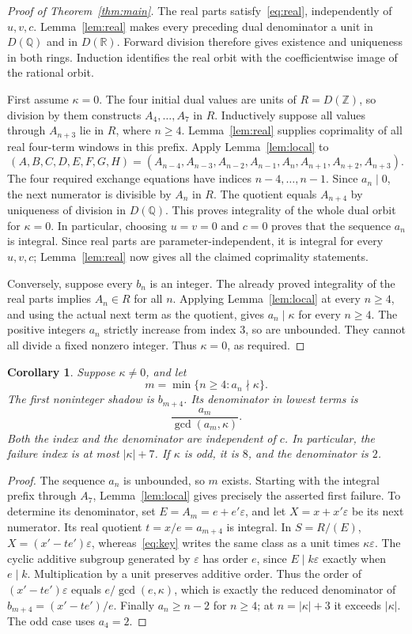 \documentclass[11pt]{article}
\newtheorem{corollary}[theorem]{Corollary}
\newcommand{\ZZ}{\mathbb Z}
\newcommand{\QQ}{\mathbb Q}
\newcommand{\RR}{\mathbb R}
\newcommand{\eps}{\varepsilon}
\begin{document}
\begin{proof}[Proof of Theorem~\ref{thm:main}]
The real parts satisfy~\eqref{eq:real}, independently of $u,v,c$.
Lemma~\ref{lem:real} makes every preceding dual denominator a unit in
$D(\QQ)$ and in $D(\RR)$. Forward division therefore gives existence
and uniqueness in both rings. Induction identifies the real orbit
with the coefficientwise image of the rational orbit.

First assume $\kappa=0$. The four initial dual values are units of
$R=D(\ZZ)$, so division by them constructs $A_4,\ldots,A_7$ in $R$.
Inductively suppose all values through $A_{n+3}$ lie in $R$, where
$n\ge4$. Lemma~\ref{lem:real} supplies coprimality of all real
four-term windows in this prefix. Apply Lemma~\ref{lem:local} to
\[
 (A,B,C,D,E,F,G,H)
 =(A_{n-4},A_{n-3},A_{n-2},A_{n-1},A_n,A_{n+1},A_{n+2},A_{n+3}).
\]
The four required exchange equations have indices $n-4,\ldots,n-1$.
Since $a_n\mid0$, the next numerator is divisible by $A_n$ in $R$.
The quotient equals $A_{n+4}$ by uniqueness of division in $D(\QQ)$.
This proves integrality of the whole dual orbit for $\kappa=0$.
In particular, choosing $u=v=0$ and $c=0$ proves that the sequence
$a_n$ is integral. Since real parts are parameter-independent, it is
integral for every $u,v,c$; Lemma~\ref{lem:real} now gives all the
claimed coprimality statements.

Conversely, suppose every $b_n$ is an integer. The already proved
integrality of the real parts implies $A_n\in R$ for all $n$.
Applying Lemma~\ref{lem:local} at every $n\ge4$, and using the actual
next term as the quotient, gives $a_n\mid\kappa$ for every $n\ge4$.
The positive integers $a_n$ strictly increase from index $3$, so are
unbounded. They cannot all divide a fixed nonzero integer. Thus
$\kappa=0$, as required.
\end{proof}

\begin{corollary}\label{cor:failure}
Suppose $\kappa\ne0$, and let
\[
 m=\min\{n\ge4:a_n\nmid\kappa\}.
\]
The first noninteger shadow is $b_{m+4}$. Its denominator in lowest
terms is
\[
 \frac{a_m}{\gcd(a_m,\kappa)}.
\]
Both the index and the denominator are independent of $c$. In particular,
the failure index is at most $|\kappa|+7$. If $\kappa$ is odd, it is $8$,
and the denominator is $2$.
\end{corollary}
\begin{proof}
The sequence $a_n$ is unbounded, so $m$ exists. Starting with the
integral prefix through $A_7$, Lemma~\ref{lem:local} gives precisely
the asserted first failure. To determine its denominator, set
$E=A_m=e+e'\eps$, and let $X=x+x'\eps$ be its next numerator.
Its real quotient $t=x/e=a_{m+4}$ is integral. In $S=R/(E)$,
$X=(x'-te')\eps$, whereas~\eqref{eq:key} writes the same class as a
unit times $\kappa\eps$. The cyclic additive subgroup generated by
$\eps$ has order $e$, since $E\mid k\eps$ exactly when $e\mid k$.
Multiplication by a unit preserves additive order. Thus the order of
$(x'-te')\eps$ equals $e/\gcd(e,\kappa)$, which is exactly the reduced
denominator of $b_{m+4}=(x'-te')/e$. Finally $a_n\ge n-2$ for $n\ge4$;
at $n=|\kappa|+3$ it exceeds $|\kappa|$. The odd case uses $a_4=2$.
\end{proof}
\end{document}
